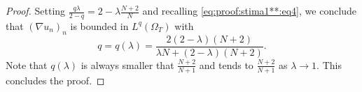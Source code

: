\documentclass[10pt,a4paper]{amsart}
\def\elleomT#1{L^{#1}(\Omega_T)}
\begin{document}
\begin{proof}
    Setting $\frac{q\lambda}{2-q}={2-\lambda}\frac{N+2}{N}$ and recalling \eqref{eq:proof:stima1**:eq4}, we conclude that $(\nabla u_n)_n$ is bounded in $\elleomT q$ with
    $$q=q(\lambda)=\frac{2(2-\lambda)(N+2)}{\lambda N +(2-\lambda)(N+2)}.$$
    Note that $q(\lambda)$ is always smaller that $\frac{N+2}{N+1}$ and tends to $\frac{N+2}{N+1}$ as $\lambda\to1$. This concludes the proof.
\end{proof}
\end{document}
